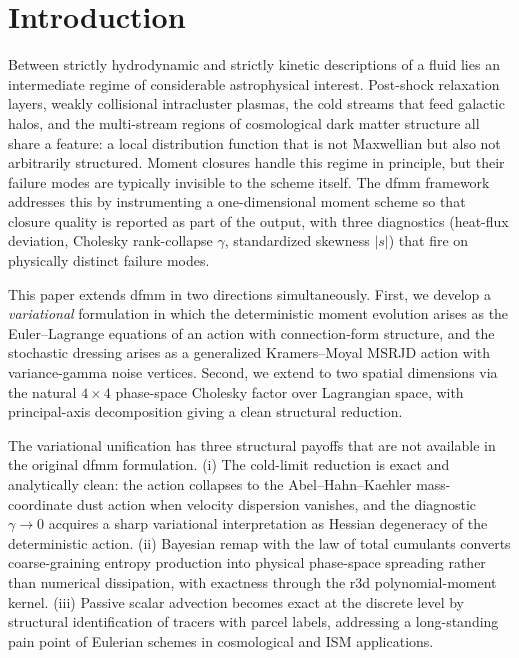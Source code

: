 \documentclass[11pt]{article}
\begin{document}
\tableofcontents

\section{Introduction}
\label{sec:intro}

Between strictly hydrodynamic and strictly kinetic descriptions of a
fluid lies an intermediate regime of considerable astrophysical
interest. Post-shock relaxation layers, weakly collisional intracluster
plasmas, the cold streams that feed galactic halos, and the multi-stream
regions of cosmological dark matter structure all share a feature: a
local distribution function that is not Maxwellian but also not
arbitrarily structured. Moment closures handle this regime in
principle, but their failure modes are typically invisible to the
scheme itself. The dfmm framework~\cite{dfmm-paper} addresses this
by instrumenting a one-dimensional moment scheme so that closure
quality is reported as part of the output, with three diagnostics
(heat-flux deviation, Cholesky rank-collapse $\gamma$, standardized
skewness $|s|$) that fire on physically distinct failure modes.

This paper extends dfmm in two directions simultaneously. First, we
develop a \emph{variational} formulation in which the deterministic
moment evolution arises as the Euler--Lagrange equations of an action
with connection-form structure, and the stochastic dressing arises
as a generalized Kramers--Moyal MSRJD action with variance-gamma noise
vertices. Second, we extend to two spatial dimensions via the natural
$4\times 4$ phase-space Cholesky factor over Lagrangian space, with
principal-axis decomposition giving a clean structural reduction.

The variational unification has three structural payoffs that are not
available in the original dfmm formulation. (i) The cold-limit
reduction is exact and analytically clean: the action collapses to
the Abel--Hahn--Kaehler mass-coordinate dust action when velocity
dispersion vanishes, and the diagnostic $\gamma\to 0$ acquires a
sharp variational interpretation as Hessian degeneracy of the
deterministic action. (ii) Bayesian remap with the law of total
cumulants converts coarse-graining entropy production into physical
phase-space spreading rather than numerical dissipation, with
exactness through the r3d polynomial-moment kernel. (iii) Passive
scalar advection becomes exact at the discrete level by structural
identification of tracers with parcel labels, addressing a
long-standing pain point of Eulerian schemes in cosmological and
ISM applications.
\end{document}
